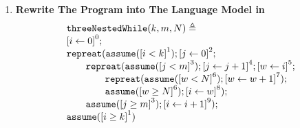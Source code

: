 \begin{enumerate}
    \item \textbf{Rewrite The Program into The Language Model in~\cite{GulwaniJK09}}
    \[
      \begin{array}{l}
        \kw{threeNestedWhile}(k, m, N) \triangleq \\
        \clabel{ \assign{i}{0} }^{0}; \\
        \rprepeat(\rpasum(\clabel{i < k}^{1}); \clabel{\assign{j}{0}}^{2};\\
        \qquad \rprepeat(\rpasum(\clabel{j < m}^{3}); \clabel{\assign{j}{j + 1}}^{4}; \clabel{\assign{w}{i}}^{5};\\
        \qquad \qquad \rprepeat(\rpasum(\clabel{w < N}^{6}); \clabel{\assign{w}{w + 1}}^{7});\\
        \qquad \qquad \rpasum(\clabel{w \geq N}^{6}); \clabel{\assign{i}{w}}^{8});\\
        \qquad \rpasum(\clabel{j \geq m}^{3}); \clabel{\assign{i}{i+1}}^{9});\\
        \rpasum(\clabel{i \geq k}^{1})
        \end{array}
      \]


\end{enumerate}

